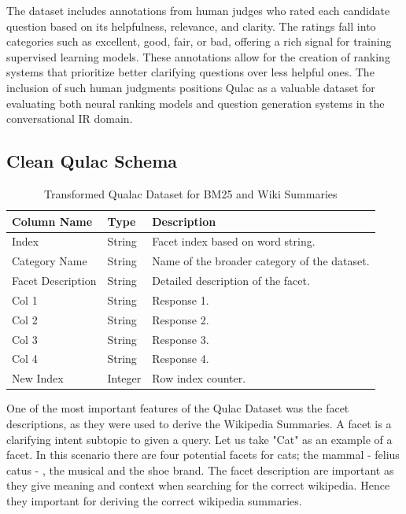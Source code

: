 \documentclass[11pt]{article}
\begin{document}
The dataset includes annotations from human judges who rated each candidate question based on its helpfulness, relevance, and clarity. The ratings fall into categories such as excellent, good, fair, or bad, offering a rich signal for training supervised learning models. These annotations allow for the creation of ranking systems that prioritize better clarifying questions over less helpful ones. The inclusion of such human judgments positions Qulac as a valuable dataset for evaluating both neural ranking models and question generation systems in the conversational IR domain.

\subsection{Clean Qulac Schema}
\renewcommand{\arraystretch}{1.2} %

\begin{table}[ht]
  \centering
  \caption{Transformed Qualac Dataset for BM25 and Wiki Summaries}
  \label{tab:dataset-columns}
  \begin{tabularx}{\columnwidth}{@{} l l X @{}}
    \hline
    \textbf{Column Name}  & \textbf{Type}    & \textbf{Description}                        \\ 
    \hline
    Index                 & String           & Facet index based on word string.            \\ 
    Category Name         & String           & Name of the broader category of the dataset. \\ 
    Facet Description     & String           & Detailed description of the facet.           \\ 
    Col 1                 & String           & Response 1.                                  \\ 
    Col 2                 & String           & Response 2.                                  \\ 
    Col 3                 & String           & Response 3.                                  \\ 
    Col 4                 & String           & Response 4.                                  \\ 
    New Index             & Integer          & Row index counter.                           \\ 
    \hline
  \end{tabularx}
\end{table}

One of the most important features of the Qulac Dataset was the facet descriptions, as they were used to derive the Wikipedia Summaries. A facet is a clarifying intent subtopic to given a query. Let us take "Cat" as an example of a facet. In this scenario there are four potential facets for cats; the mammal - felius catus - , the musical  and the shoe brand. The facet description are important as they give meaning and context when searching for the correct wikipedia. Hence they important for deriving the correct wikipedia summaries. 
\end{document}

